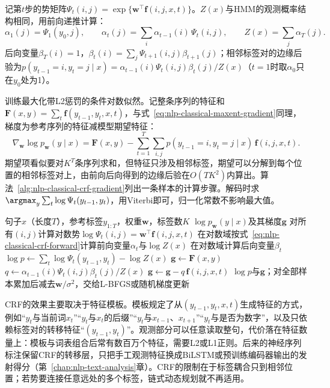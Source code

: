 记第$t$步的势矩阵$\Psi_t(i,j)=\exp\{\bm w^{\top}\bm f(i,j,x,t)\}$。$Z(x)$与HMM的观测概率结构相同，用前向递推计算：
\begin{equation}
  \alpha_1(j)=\Psi_1(y_0,j),\qquad
  \alpha_t(j)=\sum_{i}\alpha_{t-1}(i)\,\Psi_t(i,j),\qquad
  Z(x)=\sum_j\alpha_T(j).
  \label{eq:nlp-classical-crf-forward}
\end{equation}
后向变量$\beta_T(i)=1$，$\beta_t(i)=\sum_j\Psi_{t+1}(i,j)\beta_{t+1}(j)$；相邻标签对的边缘后验为$p(y_{t-1}=i,y_t=j\mid x)=\alpha_{t-1}(i)\Psi_t(i,j)\beta_t(j)/Z(x)$（$t=1$时取$\alpha_0$只在$y_0$处为1）。

训练最大化带L2惩罚的条件对数似然。记整条序列的特征和$\bm F(x,y)=\sum_t\bm f(y_{t-1},y_t,x,t)$，与式~\eqref{eq:nlp-classical-maxent-gradient}同理，梯度为参考序列的特征减模型期望特征：
\begin{equation}
  \nabla_{\bm w}\log p_{\bm w}(y\mid x)
  =\bm F(x,y)-\sum_{t=1}^{T}\sum_{i,j}p(y_{t-1}=i,y_t=j\mid x)\,\bm f(i,j,x,t).
  \label{eq:nlp-classical-crf-gradient}
\end{equation}
期望项看似要对$K^T$条序列求和，但特征只涉及相邻标签，期望可以分解到每个位置的相邻标签对上，由前向后向得到的边缘后验在$O(TK^2)$内算出。算法~\ref{alg:nlp-classical-crf-gradient}列出一条样本的计算步骤。解码时求$\argmax_y\sum_t\log\Psi_t(y_{t-1},y_t)$，用Viterbi即可，归一化常数不影响最大值。

\begin{algorithm}[线性链CRF一条样本的对数似然与梯度]
  \label{alg:nlp-classical-crf-gradient}
  \begin{algorithmic}[1]
    \Require 句子$x$（长度$T$），参考标签$y_{1:T}$，权重$\bm w$，标签数$K$
    \Ensure $\log p_{\bm w}(y\mid x)$及其梯度$\bm g$
      \State 对所有$(i,j)$计算对数势$\log\Psi_t(i,j)=\bm w^{\top}\bm f(i,j,x,t)$
    \EndFor
    \State 在对数域按式~\eqref{eq:nlp-classical-crf-forward}计算前向变量$\alpha_t$与$\log Z(x)$
    \State 在对数域计算后向变量$\beta_t$
    \State $\log p\gets\sum_t\log\Psi_t(y_{t-1},y_t)-\log Z(x)$
    \State $\bm g\gets\bm F(x,y)$
      \State $q\gets\alpha_{t-1}(i)\Psi_t(i,j)\beta_t(j)/Z(x)$ 
      \State $\bm g\gets\bm g-q\,\bm f(i,j,x,t)$
    \EndFor
    \State \Return $\log p$与$\bm g$；对全部样本累加后减去$\bm w/\sigma^2$，交给L-BFGS或随机梯度更新
  \end{algorithmic}
\end{algorithm}

CRF的效果主要取决于特征模板。模板规定了从$(y_{t-1},y_t,x,t)$生成特征的方式，例如“$y_t$与当前词$x_t$”“$y_t$与$x_t$的后缀”“$y_t$与$x_{t-1}$、$x_{t+1}$”“$y_t$与是否为数字”，以及只依赖标签对的转移特征“$(y_{t-1},y_t)$”。观测部分可以任意读取整句，代价落在特征数量上：模板与词表组合后常有数百万个特征，需要L2或L1正则。后来的神经序列标注保留CRF的转移层，只把手工观测特征换成BiLSTM或预训练编码器输出的发射得分（第~\ref{chap:nlp-text-analysis}章）。CRF的限制在于标签耦合只到相邻位置；若势要连接任意远处的多个标签，链式动态规划就不再适用。

